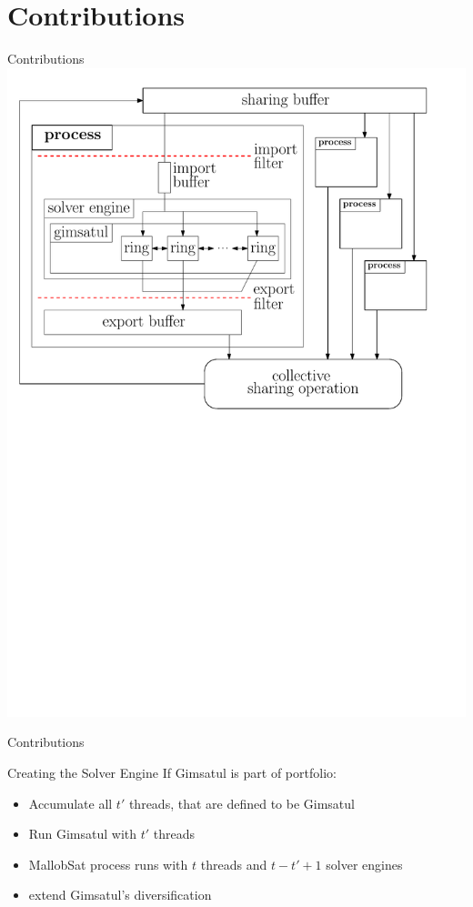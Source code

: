 \documentclass{beamer}
\begin{document}
\section{Contributions}
\begin{frame}{Contributions}
    \center
    \includegraphics[scale=.45]{figures/architecture.pdf}
\end{frame}

\begin{frame}{Contributions}
    \begin{block}{Creating the Solver Engine}
        If Gimsatul is part of portfolio:
        \begin{itemize}
            \item Accumulate all $t'$ threads, that are defined to be Gimsatul
            \item Run Gimsatul with $t'$ threads
            \item MallobSat process runs with $t$ threads and $t - t' + 1$ solver engines
            \item extend Gimsatul's diversification
        \end{itemize}
    \end{block}
\end{frame}
\end{document}
